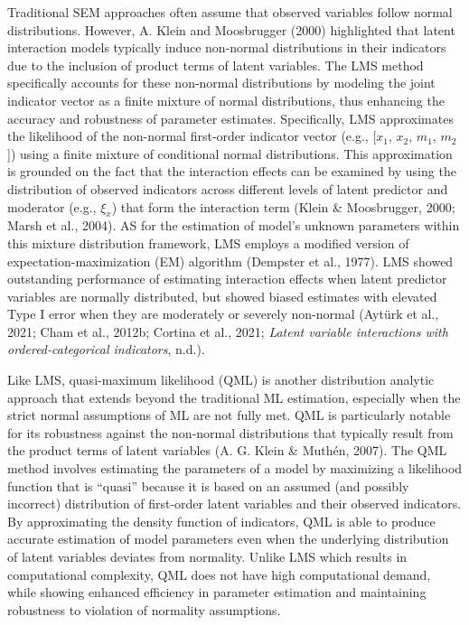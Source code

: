 \documentclass[
  11pt,
  man]{apa6}
\begin{document}
Traditional SEM approaches often assume that observed variables follow normal distributions. However, A. Klein and Moosbrugger (2000) highlighted that latent interaction models typically induce non-normal distributions in their indicators due to the inclusion of product terms of latent variables. The LMS method specifically accounts for these non-normal distributions by modeling the joint indicator vector as a finite mixture of normal distributions, thus enhancing the accuracy and robustness of parameter estimates. Specifically, LMS approximates the likelihood of the non-normal first-order indicator vector (e.g., {[}\(x_{1}\), \(x_{2}\), \(m_{1}\), \(m_{2}\){]}) using a finite mixture of conditional normal distributions. This approximation is grounded on the fact that the interaction effects can be examined by using the distribution of observed indicators across different levels of latent predictor and moderator (e.g., \(\xi_{x}\)) that form the interaction term (Klein \& Moosbrugger, 2000; Marsh et al., 2004). AS for the estimation of model's unknown parameters within this mixture distribution framework, LMS employs a modified version of expectation-maximization (EM) algorithm (Dempster et al., 1977). LMS showed outstanding performance of estimating interaction effects when latent predictor variables are normally distributed, but showed biased estimates with elevated Type I error when they are moderately or severely non-normal (Aytürk et al., 2021; Cham et al., 2012b; Cortina et al., 2021; \emph{Latent {variable interactions with ordered-categorical indicators}}, n.d.).

Like LMS, quasi-maximum likelihood (QML) is another distribution analytic approach that extends beyond the traditional ML estimation, especially when the strict normal assumptions of ML are not fully met. QML is particularly notable for its robustness against the non-normal distributions that typically result from the product terms of latent variables (A. G. Klein \& Muthén, 2007). The QML method involves estimating the parameters of a model by maximizing a likelihood function that is ``quasi'' because it is based on an assumed (and possibly incorrect) distribution of first-order latent variables and their observed indicators. By approximating the density function of indicators, QML is able to produce accurate estimation of model parameters even when the underlying distribution of latent variables deviates from normality. Unlike LMS which results in computational complexity, QML does not have high computational demand, while showing enhanced efficiency in parameter estimation and maintaining robustness to violation of normality assumptions.
\end{document}
